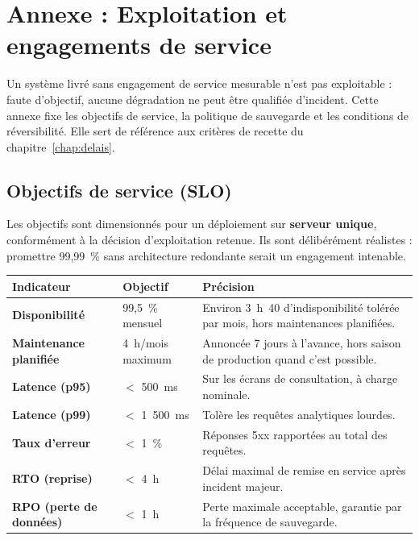 
\chapter{Annexe : Exploitation et engagements de service}
\label{chap:exploitation}
Un système livré sans engagement de service mesurable n'est pas exploitable :
faute d'objectif, aucune dégradation ne peut être qualifiée d'incident. Cette
annexe fixe les objectifs de service, la politique de sauvegarde et les
conditions de réversibilité. Elle sert de référence aux critères de recette du
chapitre~\ref{chap:delais}.

\section{Objectifs de service (SLO)}
Les objectifs sont dimensionnés pour un déploiement sur \textbf{serveur unique},
conformément à la décision d'exploitation retenue. Ils sont délibérément
réalistes : promettre 99{,}99~\% sans architecture redondante serait un
engagement intenable.

\begin{xltabular}{\textwidth}{>{\bfseries}p{4.2cm} p{3.4cm} X}
\toprule
\textbf{Indicateur} & \textbf{Objectif} & \textbf{Précision} \\
\midrule
\endhead
Disponibilité & 99{,}5~\% mensuel & Environ 3~h~40 d'indisponibilité tolérée par mois, hors maintenances planifiées. \\
\addlinespace
Maintenance planifiée & 4~h/mois maximum & Annoncée 7 jours à l'avance, hors saison de production quand c'est possible. \\
\addlinespace
Latence (p95) & $<$ 500~ms & Sur les écrans de consultation, à charge nominale. \\
\addlinespace
Latence (p99) & $<$ 1~500~ms & Tolère les requêtes analytiques lourdes. \\
\addlinespace
Taux d'erreur & $<$ 1~\% & Réponses 5xx rapportées au total des requêtes. \\
\addlinespace
\textbf{RTO} (reprise) & $<$ 4~h & Délai maximal de remise en service après incident majeur. \\
\addlinespace
\textbf{RPO} (perte de données) & $<$ 1~h & Perte maximale acceptable, garantie par la fréquence de sauvegarde. \\
\bottomrule
\end{xltabular}

